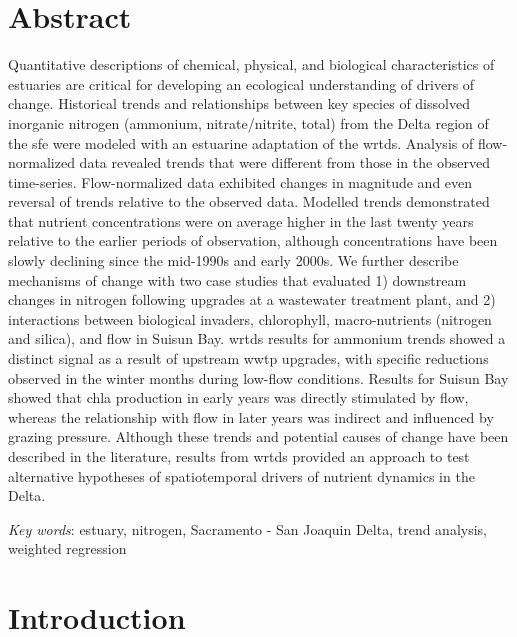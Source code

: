 \documentclass[letterpaper,12pt,oneside]{article}\usepackage[]{graphicx}\usepackage[]{color}
\begin{document}
\section*{Abstract}
\noindent Quantitative descriptions of chemical, physical, and biological characteristics of estuaries are critical for developing an ecological understanding of drivers of change.  Historical trends and relationships between key species of dissolved inorganic nitrogen (ammonium, nitrate/nitrite, total) from the Delta region of the \acl{sfe} were modeled with an estuarine adaptation of the \ac{wrtds}. Analysis of flow-normalized data revealed trends that were different from those in the observed time-series. Flow-normalized data exhibited changes in magnitude and even reversal of trends relative to the observed data. Modelled trends demonstrated that nutrient concentrations were on average higher in the last twenty years relative to the earlier periods of observation, although concentrations have been slowly declining since the mid-1990s and early 2000s. We further describe mechanisms of change with two case studies that evaluated 1) downstream changes in nitrogen following upgrades at a wastewater treatment plant, and 2) interactions between biological invaders, chlorophyll, macro-nutrients (nitrogen and silica), and flow in Suisun Bay.  \ac{wrtds} results for ammonium trends showed a distinct signal as a result of upstream \acl{wwtp} upgrades, with specific reductions observed in the winter months during low-flow conditions. Results for Suisun Bay showed that \acl{chla} production in early years was directly stimulated by flow, whereas the relationship with flow in later years was indirect and influenced by grazing pressure. Although these trends and potential causes of change have been described in the literature, results from \ac{wrtds} provided an approach to test alternative hypotheses of spatiotemporal drivers of nutrient dynamics in the Delta.

\noindent \textit{Key words}: estuary, nitrogen, Sacramento - San Joaquin Delta, trend analysis, weighted regression
\acresetall

\section{Introduction}
\end{document}
